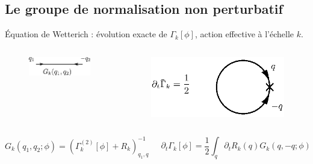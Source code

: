 \documentclass[xcolor=dvipsnames]{beamer}
\newcommand{\p}[1]{\partial_{#1}}
\newcommand{\gam}{\ensuremath{\Gamma}} %
\begin{document}
\subsection{Le groupe de normalisation non perturbatif}
\begin{frame}

Équation de Wetterich : évolution exacte de $\gam_k[\phi]$, action effective à l'échelle $k$.

\begin{columns}

\begin{column}{6cm}
\begin{figure}[htp]
\centering
\includegraphics[scale=0.825]{img/propagateur.pdf}
\label{}
\end{figure}
\end{column}

\begin{column}{6cm}
\begin{figure}[htp]
\centering
\includegraphics[scale=0.825]{img/dtgam.eps}
\label{}
\end{figure} 
\end{column}

\end{columns}

\begin{columns}

\begin{column}{6cm}
\[G_k(q_1,q_2 ; \phi) =  \left( \Gamma^{(2)}_k[\phi] + R_k \right)^{-1}_{q_1,q_2} \] 

\end{column}

\begin{column}{6cm}
\[\p{t} \gam_k[\phi] = \frac{1}{2} \int_q \p{t}R_k(q)  G_k(q,-q;\phi)  \] 
\end{column}

\end{columns}

\end{frame}
\end{document}
